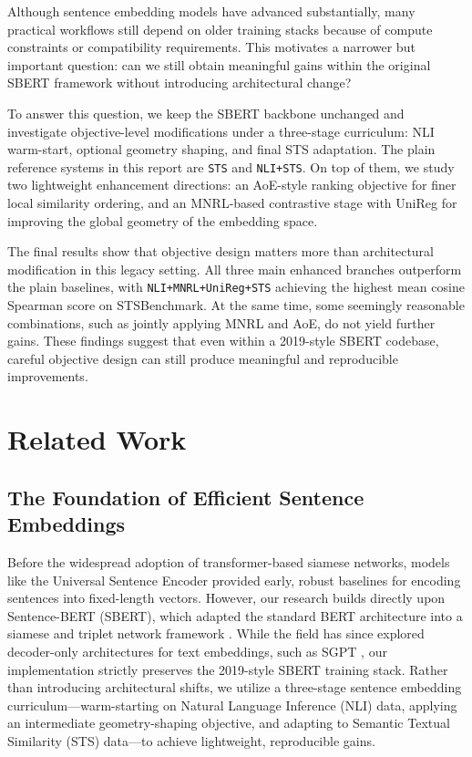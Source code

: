 \documentclass[letterpaper]{article} %
\begin{document}
Although sentence embedding models have advanced substantially, many practical workflows still depend on older training stacks because of compute constraints or compatibility requirements. This motivates a narrower but important question: can we still obtain meaningful gains within the original SBERT framework without introducing architectural change?

To answer this question, we keep the SBERT backbone unchanged and investigate objective-level modifications under a three-stage curriculum: NLI warm-start, optional geometry shaping, and final STS adaptation. The plain reference systems in this report are \texttt{STS} and \texttt{NLI+STS}. 
On top of them, we study two lightweight enhancement directions: an AoE-style ranking objective for finer local similarity ordering, and an MNRL-based contrastive stage with UniReg for improving the global geometry of the embedding space.

The final results show that objective design matters more than architectural modification in this legacy setting. All three main enhanced branches outperform the plain baselines, with \texttt{NLI+MNRL+UniReg+STS} achieving the highest mean cosine Spearman score on STSBenchmark. 
At the same time, some seemingly reasonable combinations, such as jointly applying MNRL and AoE, do not yield further gains. These findings suggest that even within a 2019-style SBERT codebase, careful objective design can still produce meaningful and reproducible improvements.

\section{Related Work}

\subsection{The Foundation of Efficient Sentence Embeddings}
Before the widespread adoption of transformer-based siamese networks, models like the Universal Sentence Encoder \cite{cer-etal-2018-universal} provided early, robust baselines for encoding sentences into fixed-length vectors. 
However, our research builds directly upon Sentence-BERT (SBERT), which adapted the standard BERT architecture into a siamese and triplet network framework \cite{reimers-gurevych-2019-sentence-bert, devlin-etal-2019-bert}. 
While the field has since explored decoder-only architectures for text embeddings, such as SGPT \cite{muennighoff-2022-sgpt}, our implementation strictly preserves the 2019-style SBERT training stack. 
Rather than introducing architectural shifts, we utilize a three-stage sentence embedding curriculum---warm-starting on Natural Language Inference (NLI) data, applying an intermediate geometry-shaping objective, and adapting to Semantic Textual Similarity (STS) data---to achieve lightweight, reproducible gains.
\end{document}
